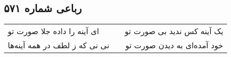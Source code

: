 \begin{center}
\section*{رباعی شماره ۵۷۱}
\label{sec:sh571}
\begin{longtable}{l p{0.5cm} r}
ای آینه را داده جلا صورت تو
&&
یک آینه کس ندید بی صورت تو
\\
نی نی که ز لطف در همه آینه‌ها
&&
خود آمده‌ای به دیدن صورت تو
\\
\end{longtable}
\end{center}
